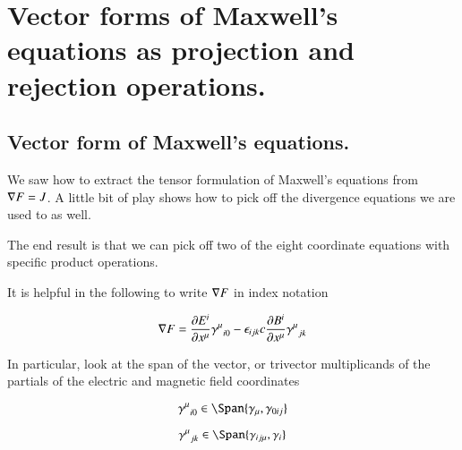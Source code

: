 
\chapter{Vector forms of Maxwell's equations as projection and rejection operations.}

\section{Vector form of Maxwell's equations. }


We saw how to extract the tensor formulation of Maxwell's equations
from $\grad F = J$.  A little bit of play shows how to pick off the divergence
equations we are used to as well.

The end result is that we can pick off two of the eight coordinate equations
with specific product operations.

It is helpful in the following to write $\grad F$ in index notation

\begin{equation}
\grad F = \PD{x^\mu}{E^i} {\gamma^{\mu}}_{i 0} - \epsilon_{i j k} c \PD{x^\mu}{B^i} {\gamma^{\mu}}_{j k}
\end{equation}

In particular, look at the span of the vector, or trivector multiplicands of
the partials of the electric and magnetic field coordinates

\begin{equation}\label{eqn:vecMaxProj:spanpartialE}
{\gamma^{\mu}}_{i 0} \in \Span \{ \gamma_{\mu}, \gamma_{0 i j} \}
\end{equation}

\begin{equation}\label{eqn:vecMaxProj:spanpartialB}
{\gamma^{\mu}}_{j k} \in \Span \{ \gamma_{i j \mu}, \gamma_i \}
\end{equation}

